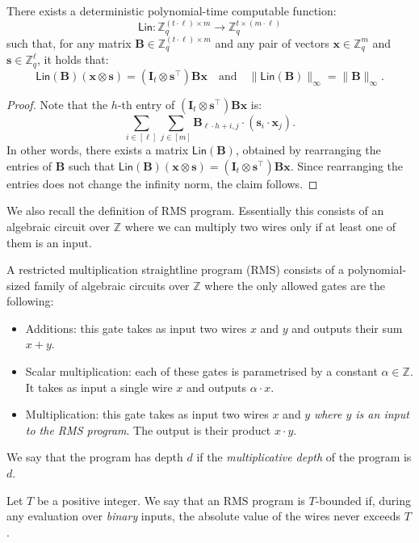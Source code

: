 \documentclass{article}
\newcommand{\Z}{\mathbb{Z}}
\newcommand{\id}{\ensuremath{\mathbf{I}}}
\newcommand{\thmlab}[1]{\label{thm:#1}}
\begin{document}
\begin{lemma}
\thmlab{linearisation}
    There exists a deterministic polynomial-time computable function:
    \[
    \mathsf{Lin} : \Z_q^{(t\cdot \ell)\times m} \to \Z_q^{t\times (m\cdot \ell)}
    \]
    such that, for any matrix 
    $\mathbf{B}\in \Z_q^{(t\cdot \ell)\times m}$ and any pair of vectors $\mathbf{x}\in\Z_q^{m}$ and $\mathbf{s}\in\Z_q^\ell$, it holds that:
    \[
    \mathsf{Lin}(\mathbf{B})(\mathbf{x}\otimes \mathbf{s})=(\id_t\otimes \mathbf{s}^\intercal) \mathbf{B}\mathbf{x} \quad\text{and}\quad \|\mathsf{Lin}(\mathbf{B})\|_\infty = \|\mathbf{B}\|_\infty.
    \]
    \end{lemma}
\begin{proof}
Note that the $h$-th entry of $(\id_t\otimes \mathbf{s}^\intercal) \mathbf{B} \mathbf{x}$ is: 
\[\sum_{i\in[\ell]}\sum_{j\in[m]} \mathbf{B}_{\ell\cdot h+i, j} \cdot (\mathbf{s}_{i}\cdot \mathbf{x}_{j}).\]
In other words, there exists a matrix $\mathsf{Lin}(\mathbf{B})$, obtained by rearranging the entries of $\mathbf{B}$ such that $\mathsf{Lin}(\mathbf{B}) (\mathbf{x}\otimes \mathbf{s})=(\id_t\otimes \mathbf{s}^\intercal) \mathbf{B} \mathbf{x}$. Since rearranging the entries does not change the infinity norm, the claim follows.
\end{proof}

We also recall the definition of RMS program. Essentially this consists of an algebraic circuit over $\Z$ where we can multiply two wires only if at least one of them is an input.

\begin{definition}
A restricted multiplication straightline program (RMS) consists of a polynomial-sized family of algebraic circuits over $\Z$ where the only allowed gates are the following:
\begin{itemize}
    \item Additions: this gate takes as input two wires $x$ and $y$ and outputs their sum $x+y$.
    \item Scalar multiplication: each of these gates is parametrised by a constant $\alpha\in\Z$. It takes as input a single wire $x$ and outputs $\alpha\cdot x$.
    \item Multiplication: this gate takes as input two wires $x$ and $y$ \emph{where $y$ is an input to the RMS program}. The output is their product $x\cdot y$.
\end{itemize}
We say that the program has depth $d$ if the \emph{multiplicative depth} of the program is $d$.

Let $T$ be a positive integer. We say that an RMS program is $T$-bounded if, during any evaluation over \emph{binary} inputs, the absolute value of the wires never exceeds $T$.
\end{definition}
\end{document}
